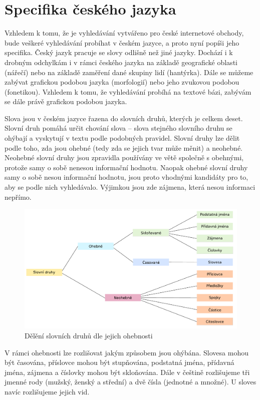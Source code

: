 \documentclass[FM,DP]{tulthesis}
\begin{document}
\section{Specifika českého jazyka}

Vzhledem k tomu, že je vyhledávání vytvářeno pro české internetové obchody, 
bude veškeré vyhledávání probíhat v českém jazyce, a proto nyní popíši jeho specifika.
Český jazyk pracuje se slovy odlišně než jiné jazyky. Dochází i k drobným
odchylkám i v rámci českého jazyka na základě geografické oblasti (nářečí)
nebo na základě zaměření dané skupiny lidí (hantýrka). Dále se můžeme zabývat
grafickou podobou jazyka (morfologií) nebo jeho zvukovou podobou (fonetikou).
Vzhledem k tomu, že vyhledávání probíhá na textové bázi, zabývám se dále právě 
grafickou podobou jazyka.

Slova jsou v českém jazyce řazena do slovních druhů, kterých je celkem deset.
Slovní druh pomáhá určit chování slova -- slova stejného slovního druhu se ohýbají
a vyskytují v textu podle podobných pravidel. Slovní druhy lze dělit podle
toho, zda jsou ohebné (tedy zda se jejich tvar může měnit) a neohebné.
Neohebné slovní druhy jsou zpravidla používány ve větě společně s obehnými, 
protože samy o sobě nenesou informační hodnotu. Naopak ohebné slovní druhy
samy o sobě nesou informační hodnotu, jsou proto vhodnými kandidáty pro
to, aby se podle nich vyhledávalo. Výjimkou jsou zde zájmena, která nesou 
informaci nepřímo.

\begin{figure}[h]
\center
\includegraphics[width=\textwidth]{slovni-druhy.pdf}
\caption{Dělění slovních druhů dle jejich ohebnosti}
\label{slovni-druhy}
\end{figure}

V rámci ohebnosti lze rozlišovat jakým způsobem jsou ohýbána. Slovesa mohou být
časována, příslovce mohou být stupňována, podstatná jména, přídavná jména, zájmena
a číslovky mohou být skloňována. Dále v češtině rozlišujeme tři jmenné rody
(mužský, ženský a střední) a dvě čísla (jednotné a množné). U sloves navíc 
rozlišujeme jejich vid.
\end{document}
